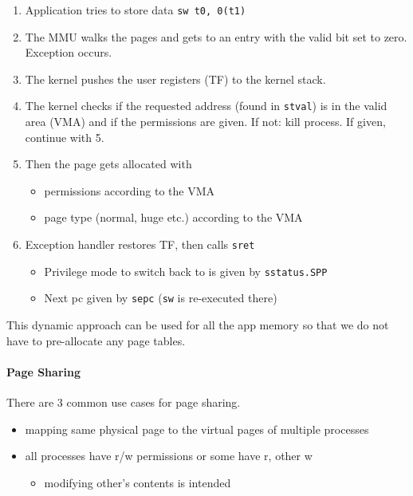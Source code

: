 \begin{enumerate}
    \item Application tries to store data
          \texttt{sw t0, 0(t1)}
    \item The MMU walks the pages and gets to an entry with the valid bit set to zero. Exception occurs.
    \item The kernel pushes the user registers (TF) to the kernel stack.
    \item The kernel checks if the requested address (found in \texttt{stval}) is in the valid area (VMA) and if the permissions are given. If not: kill process. If given, continue with 5.
    \item Then the page gets allocated with
          \begin{itemize}
              \item permissions according to the VMA
              \item page type (normal, huge etc.) according to the VMA
          \end{itemize}
    \item Exception handler restores TF, then calls \texttt{sret}
          \begin{itemize}
              \item Privilege mode to switch back to is given by \texttt{sstatus.SPP}
              \item Next pc given by \texttt{sepc} (\texttt{sw} is re-executed there)
          \end{itemize}
\end{enumerate}

\newpar{}

This dynamic approach can be used for all the app memory so that we do not have to pre-allocate any page tables.

\paragraph{Page Sharing}
There are 3 common use cases for page sharing.

\newpar{}

\begin{itemize}
    \item mapping same physical page to the virtual pages of multiple processes
    \item all processes have r/w permissions or some have r, other w
          \begin{itemize}
              \item modifying other's contents is intended
          \end{itemize}
\end{itemize}

